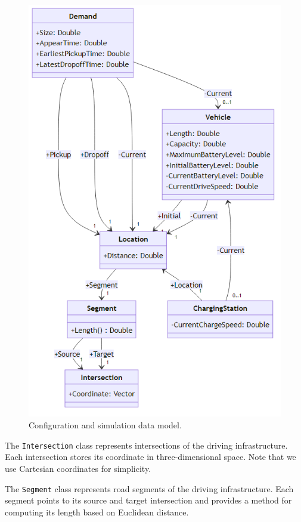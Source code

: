 \documentclass[a4paper,twoside]{article}
\begin{document}
	\begin{figure}[!ht]
		\centering
		\includegraphics[scale=0.30]{../../diagrams/model/classes-v0.2.png}
		\caption{Configuration and simulation data model.}
		\label{fig:data-model}
	\end{figure}
	
	The \texttt{Intersection} class represents intersections of the driving infrastructure.
	Each intersection stores its coordinate in three-dimensional space.
	Note that we use Cartesian coordinates for simplicity.
	
	The \texttt{Segment} class represents road segments of the driving infrastructure.
	Each segment points to its source and target intersection and provides a method for computing its length based on Euclidean distance.
	
\end{document}
